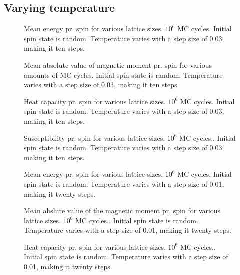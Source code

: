 \documentclass{emulateapj}
\begin{document}
\subsection{Varying temperature}
\begin{figure}
\mbox{}
\caption{Mean energy pr. spin for various lattice sizes. $10^6$ MC cycles. Initial spin state is random. Temperature varies with a step size of 0.03, making it ten steps.}
\label{fig:E-T2-23}
\end{figure}
%
\begin{figure}
\mbox{}
\caption{Mean absolute value of magnetic moment pr. spin for various amounts of MC cycles. Initial spin state is random. Temperature varies with a step size of 0.03, making it ten steps.}
\label{fig:M-T2-23}
\end{figure}
%
\begin{figure}
\mbox{}
\caption{Heat capacity pr. spin for various lattice sizes. $10^6$ MC cycles. Initial spin state is random. Temperature varies with a step size of 0.03, making it ten steps.}
\label{fig:CV-T2-23}
\end{figure}
%
\begin{figure}
\mbox{}
\caption{Susceptibility pr. spin for various lattice sizes. $10^6$ MC cycles.. Initial spin state is random. Temperature varies with a step size of 0.03, making it ten steps.}
\label{fig:chi-T2-23}
\end{figure}
%
\begin{figure}
\mbox{}
\caption{Mean energy pr. spin for various lattice sizes. $10^6$ MC cycles. Initial spin state is random. Temperature varies with a step size of 0.01, making it twenty steps.}
\label{fig:E-T22-23}
\end{figure}
%
\begin{figure}
\mbox{}
\caption{Mean abslute value of the magnetic moment pr. spin for various lattice sizes. $10^6$ MC cycles.. Initial spin state is random. Temperature varies with a step size of 0.01, making it twenty steps.}
\label{fig:M-T22-23}
\end{figure}
%
\begin{figure}
\mbox{}
\caption{Heat capacity pr. spin for various lattice sizes. $10^6$ MC cycles.. Initial spin state is random. Temperature varies with a step size of 0.01, making it twenty steps.}
\label{fig:CV-T22-24}
\end{figure}
\end{document}
